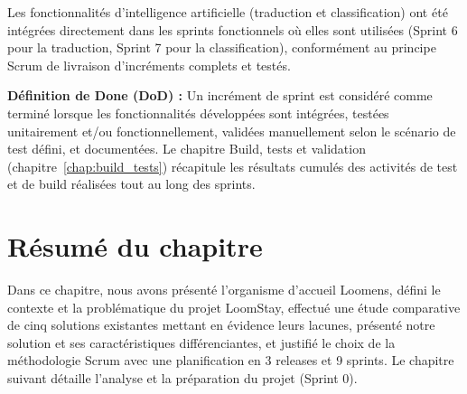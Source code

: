 Les fonctionnalités d'intelligence artificielle (traduction et classification) ont été intégrées directement dans les sprints fonctionnels où elles sont utilisées (Sprint 6 pour la traduction, Sprint 7 pour la classification), conformément au principe Scrum de livraison d'incréments complets et testés.

\textbf{Définition de Done (DoD) :} Un incrément de sprint est considéré comme terminé lorsque les fonctionnalités développées sont intégrées, testées unitairement et/ou fonctionnellement, validées manuellement selon le scénario de test défini, et documentées. Le chapitre \og Build, tests et validation \fg{} (chapitre~\ref{chap:build_tests}) récapitule les résultats cumulés des activités de test et de build réalisées tout au long des sprints.


\section*{Résumé du chapitre}

Dans ce chapitre, nous avons présenté l'organisme d'accueil Loomens, défini le contexte et la problématique du projet LoomStay, effectué une étude comparative de cinq solutions existantes mettant en évidence leurs lacunes, présenté notre solution et ses caractéristiques différenciantes, et justifié le choix de la méthodologie Scrum avec une planification en 3 releases et 9 sprints. Le chapitre suivant détaille l'analyse et la préparation du projet (Sprint 0).

